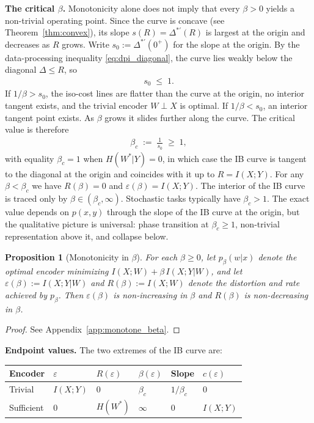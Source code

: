 \documentclass[11pt]{article}
\newtheorem{proposition}{Proposition}
\begin{document}
\medskip
\noindent\textbf{The critical $\beta$.}
Monotonicity alone does not imply that every $\beta>0$ yields a
non-trivial operating point.
Since the curve is concave (see Theorem~\ref{thm:convex}), its slope
$s(R)=\Delta^{*\prime}(R)$ is largest at the origin and decreases as
$R$ grows.
Write $s_0:=\Delta^{*\prime}(0^+)$ for the slope at the origin.
By the data-processing inequality \eqref{eq:dpi_diagonal}, the curve
lies weakly below the diagonal $\Delta\leq R$, so
\begin{align}
    s_0 \;\leq\; 1.
    \label{eq:s0_bound}
\end{align}
If $1/\beta>s_0$, the iso-cost lines are flatter than the curve at
the origin, no interior tangent exists, and the trivial encoder
$W\perp X$ is optimal.
If $1/\beta<s_0$, an interior tangent point exists. As $\beta$
grows it slides further along the curve.
The critical value is therefore
\begin{align}
    \beta_c \;:=\; \frac{1}{s_0} \;\geq\; 1,
    \label{eq:beta_c}
\end{align}
with equality $\beta_c=1$ when $H(W^*|Y)=0$, in which case the IB
curve is tangent to the diagonal at the origin and coincides with it
up to $R=I(X;Y)$.
For any $\beta<\beta_c$ we have $R(\beta)=0$ and
$\varepsilon(\beta)=I(X;Y)$. The interior of the IB curve is traced
only by $\beta\in(\beta_c,\infty)$.
Stochastic tasks typically have $\beta_c>1$. The exact value depends
on $p(x,y)$ through the slope of the IB curve at the origin, but
the qualitative picture is universal: phase transition at
$\beta_c\geq 1$, non-trivial representation above it, and
collapse below.

\begin{proposition}[Monotonicity in $\beta$]
    \label{prop:monotone_beta}
    For each $\beta\geq 0$, let $p_\beta(w|x)$ denote the optimal encoder
    minimizing $I(X;W)+\beta\,I(X;Y|W)$, and let
    $\varepsilon(\beta):=I(X;Y|W)$ and $R(\beta):=I(X;W)$ denote the
    distortion and rate achieved by $p_\beta$.
    Then $\varepsilon(\beta)$ is non-increasing in $\beta$ and $R(\beta)$
    is non-decreasing in $\beta$.
\end{proposition}

\begin{proof}
    See Appendix~\ref{app:monotone_beta}.
\end{proof}
    

\medskip
\noindent\textbf{Endpoint values.}
The two extremes of the IB curve are:
\begin{center}
\begin{tabular}{|l|l|l|l|l|l|}
\hline
Encoder & $\varepsilon$ & $R(\varepsilon)$ & $\beta(\varepsilon)$ & Slope & $c(\varepsilon)$ \\
\hline
Trivial & $I(X;Y)$ & $0$ & $\beta_c$ & $1/\beta_c$ & $0$ \\
Sufficient & $0$ & $H(W^*)$ & $\infty$ & $0$ & $I(X;Y)$ \\
\hline
\end{tabular}
\end{center}
\end{document}
